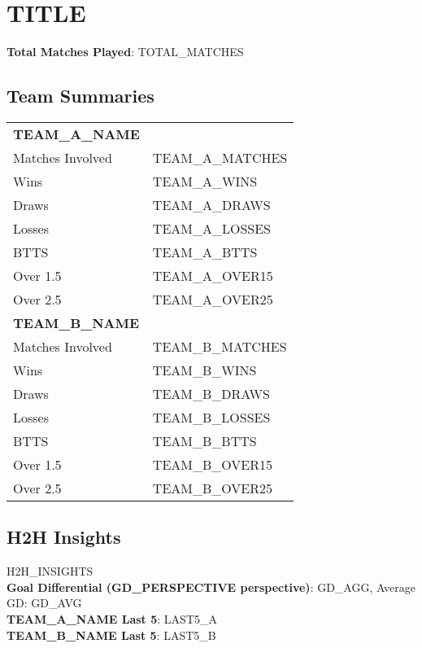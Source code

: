 \documentclass[a4paper,12pt]{article}
\begin{document}

\section*{{{TITLE}}}
\textbf{Total Matches Played}: {{TOTAL_MATCHES}} \\

\subsection*{Team Summaries}
\begin{tabular}{ll}
  \toprule
  \textbf{{{TEAM_A_NAME}}} & \\
  Matches Involved & {{TEAM_A_MATCHES}} \\
  Wins & {{TEAM_A_WINS}} \\
  Draws & {{TEAM_A_DRAWS}} \\
  Losses & {{TEAM_A_LOSSES}} \\
  BTTS & {{TEAM_A_BTTS}} \\
  Over 1.5 & {{TEAM_A_OVER15}} \\
  Over 2.5 & {{TEAM_A_OVER25}} \\
  \midrule
  \textbf{{{TEAM_B_NAME}}} & \\
  Matches Involved & {{TEAM_B_MATCHES}} \\
  Wins & {{TEAM_B_WINS}} \\
  Draws & {{TEAM_B_DRAWS}} \\
  Losses & {{TEAM_B_LOSSES}} \\
  BTTS & {{TEAM_B_BTTS}} \\
  Over 1.5 & {{TEAM_B_OVER15}} \\
  Over 2.5 & {{TEAM_B_OVER25}} \\
  \bottomrule
\end{tabular}

\subsection*{H2H Insights}
{{H2H_INSIGHTS}} \\
\textbf{Goal Differential ({{GD_PERSPECTIVE}} perspective)}: {{GD_AGG}}, Average GD: {{GD_AVG}} \\
\textbf{{{TEAM_A_NAME}} Last 5}: {{LAST5_A}} \\
\textbf{{{TEAM_B_NAME}} Last 5}: {{LAST5_B}} \\
\end{document}
